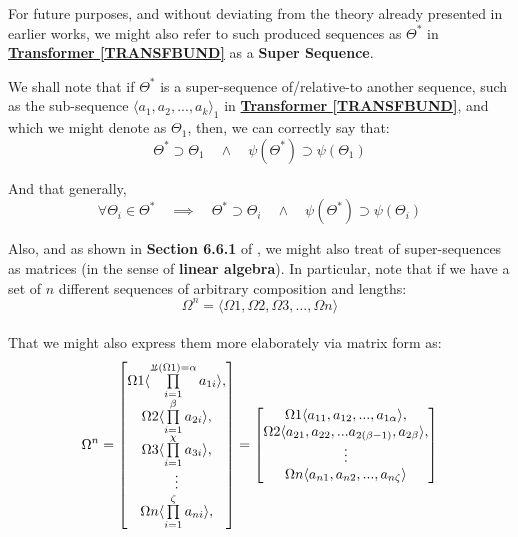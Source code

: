 \documentclass[12pt,a4paper]{article}
\newcommand{\invpi}[1]{\mathop{\rotatebox[origin=c]{180}{$\pi$}}#1}
\begin{document}
For future purposes, and without deviating from the theory already presented in earlier works, we might also refer to such produced sequences as $\Theta^*$ in \textbf{\hyperref[TRANSFBUND]{Transformer \ref{TRANSFBUND}}} as a \textbf{Super Sequence}.

We shall note that if $\Theta^*$ is a super-sequence of/relative-to another sequence, such as the sub-sequence $\langle a_1, a_2,..., a_k \rangle_1$ in \textbf{\hyperref[TRANSFBUND]{Transformer \ref{TRANSFBUND}}}, and which we might denote as $\Theta_1$, then, we can correctly say that:\\


\begin{equation}
\Theta^* \supset \Theta_1 \quad \land \quad \psi(\Theta^*) \supset \psi(\Theta_1)
\end{equation}

And that generally,\\


\begin{equation}
\forall \Theta_i \in \Theta^* \quad \implies \quad \Theta^* \supset \Theta_i \quad \land \quad \psi(\Theta^*) \supset \psi(\Theta_i)
\end{equation}

Also, and as shown in \textbf{Section 6.6.1} of \cite{lutalo_2025_trans_genetics}, we might also treat of super-sequences as matrices (in the sense of \textbf{linear algebra}). In particular, note that if we have a set of $n$ different sequences of arbitrary composition and lengths:\\


\begin{equation}
 \Omega^n = \langle \Omega1, \Omega2, \Omega3,..., \Omega n \rangle
\end{equation}\\


That we might also express them more elaborately via matrix form as:\\


\begin{multline}
 \Omega^n = 
 \begin{bmatrix}
 \Omega1 \langle \prod\limits_{i=1}^{\invpi(\Omega 1) = \alpha} a_{1i} \rangle,\\
  \Omega2 \langle \prod\limits_{i=1}^{\beta} a_{2i} \rangle,\\
   \Omega3 \langle \prod\limits_{i=1}^{\chi} a_{3i} \rangle,\\
   \vdots \\
   \Omega n \langle \prod\limits_{i=1}^{\zeta} a_{ni} \rangle,\\
 \end{bmatrix} =
 \begin{bmatrix}
 \Omega1 \langle a_{11},a_{12},...,a_{1\alpha} \rangle,\\
   \Omega2 \langle a_{21},a_{22},...a_{2(\beta-1)} ,a_{2\beta} \rangle,\\
   \vdots \\
     \Omega n \langle a_{n1},a_{n2},...,a_{n\zeta} \rangle\\
 \end{bmatrix}
\end{multline}\\
\end{document}
